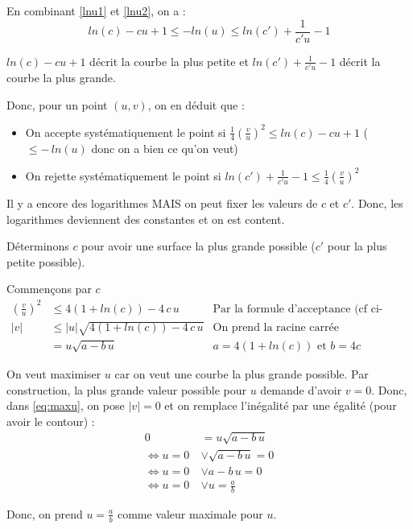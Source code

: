 En combinant \eqref{lnu1} et \eqref{lnu2}, on a :
\begin{equation}
    ln(c) - cu + 1 \leq -ln(u) \leq ln(c') + \frac{1}{c'u} - 1
    \label{eq:lnu}
\end{equation}

$ln(c) - cu + 1$ décrit la courbe la plus petite et $ln(c') + \frac{1}{c'u} - 1$ décrit la courbe la plus grande.

Donc, pour un point $(u, v)$, on en déduit que :
\begin{itemize}
    \item On accepte systématiquement le point si $\frac{1}{4}(\frac{v}{u})^2 \leq ln(c) - cu + 1$ ($\leq -\,ln(u)$ donc on a bien ce qu'on veut)
    \item On rejette systématiquement le point si $ln(c') + \frac{1}{c'u} - 1 \leq \frac{1}{4}(\frac{v}{u})^2$
\end{itemize}

Il y a encore des logarithmes MAIS on peut fixer les valeurs de $c$ et $c'$. Donc, les logarithmes deviennent des constantes et on est content.

Déterminons $c$ pour avoir une surface la plus grande possible ($c'$ pour la plus petite possible).

Commençons par $c$
\begin{align}
    (\frac{v}{u})^2 &\leq 4(1 + ln(c)) - 4\,c\,u & \text{Par la formule d'acceptance (cf ci-dessus)}\nonumber\\
    |v| &\leq |u|\sqrt{4(1+ln(c)) - 4\,c\,u} & \text{On prend la racine carrée}\nonumber\\
    &= u\sqrt{a-b\,u}   & a = 4(1+ln(c))\text{ et } b = 4c \label{eq:maxu}
\end{align}

On veut maximiser $u$ car on veut une courbe la plus grande possible. Par construction, la plus grande valeur possible pour $u$ demande d'avoir $v=0$. Donc, dans \eqref{eq:maxu}, on pose $|v|=0$ et on remplace l'inégalité par une égalité (pour avoir le contour) :
\begin{align*}
    0 &= u\sqrt{a-b\,u}\\
    \iff u = 0\ &\vee \sqrt{a-b\,u} = 0\\
    \iff u = 0\ &\vee a-b\,u = 0\\
    \iff u = 0\ &\vee u = \frac{a}{b}
\end{align*}

Donc, on prend $u = \frac{a}{b}$ comme valeur maximale pour $u$.

